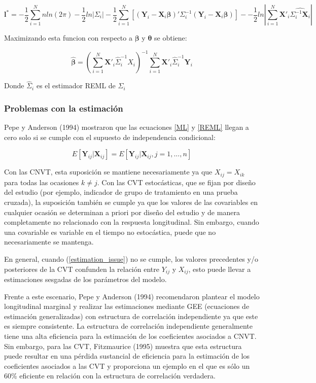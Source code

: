 \documentclass[spanish]{article}
\numberwithin{figure}{subsection}
\numberwithin{equation}{subsection}
\numberwithin{table}{subsection}
\begin{document}
\begin{equation}
\label{REML}
	\bm{l}^* = -\frac{1}{2} \sum_{i=1}^{N}n ln(2\pi) - \frac{1}{2}ln|\bm{\varSigma}_i| -
	\frac{1}{2} \sum_{i=1}^{N} [(\bm{Y}_i - \bm{X}_i\bm{\beta})'
	\bm{\varSigma}_i^{-1} (\bm{Y}_i - \bm{X}_i\bm{\beta})] -
	- \frac{1}{2} ln |\sum_{i=1}^{N} \bm{X}'_i \hat{\bm{\varSigma}_i^{-1} \bm{X}_i}|
\end{equation}

Maximizando esta funcion con respecto a $\bm{\beta}$ y $\bm{\theta}$ se obtiene:

\[ \hat{\bm{\beta}} = (\sum_{i=1}^{N} \bm{X}'_i \hat{\bm{\varSigma}}_i^{-1} X_i)^{-1}
\sum_{i=1}^{N} \bm{X}'_i \hat{\bm{\varSigma}}_i^{-1} \bm{Y}_i\]

Donde $\hat{\bm{\varSigma}}_i$ es el estimador REML de ${\bm{\varSigma}_i}$

\subsubsection{Problemas con la estimación}

Pepe y Anderson (1994) mostraron que las ecuaciones \ref{ML} y \ref{REML} llegan
a cero solo si se cumple con el supuesto de independencia condicional:

\begin{equation}
\label{estimation_issue}
	E[\bm{Y}_{ij} | \bm{X}_{ij}] = E[\bm{Y}_{ij} | \bm{X}_{ij}, j = 1, ..., n]
\end{equation}

Con las CNVT, esta suposición se mantiene necesariamente ya que $X_{ij} =
X_{ik}$ para todas las ocasiones $k \neq j$. Con las CVT estocásticas, que se
fijan por diseño del estudio (por ejemplo, indicador de grupo de tratamiento en
una prueba cruzada), la suposición también se cumple ya que los valores de las
covariables en cualquier ocasión se determinan a priori por diseño del estudio y
de manera completamente no relacionado con la respuesta longitudinal. Sin
embargo, cuando una covariable es variable en el tiempo no estocástica, puede
que no necesariamente se mantenga.

En general, cuando (\ref{estimation_issue}) no se cumple, los valores
precedentes y/o posteriores de la CVT confunden la relación entre $Y_{ij}$ y
$X_{ij}$, esto puede llevar a estimaciones sesgadas de los parámetros del
modelo.

Frente a este escenario, Pepe y Anderson (1994) recomendaron plantear el modelo
longitudinal marginal y realizar las estimaciones mediante GEE (ecuaciones de
estimación generalizadas) con estructura de correlación independiente ya que
este es siempre consistente. La estructura de correlación independiente
generalmente tiene una alta eficiencia para la estimación de los coeficientes
asociados a CNVT. Sin embargo, para las CVT, Fitzmaurice (1995) muestra que esta
estructura puede resultar en una pérdida sustancial de eficiencia para la
estimación de los coeficientes asociados a las CVT y proporciona un ejemplo en
el que es sólo un 60\% eficiente en relación con la estructura de correlación
verdadera.
\end{document}
